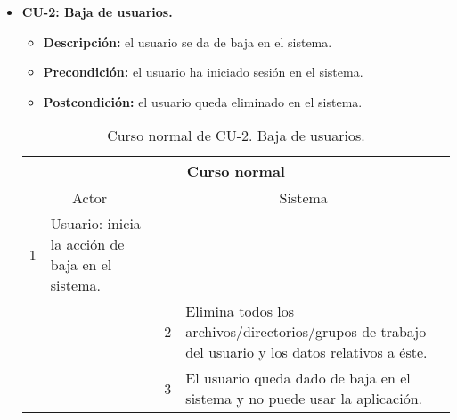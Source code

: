 \begin{itemize}
	\item \textbf{CU-2: Baja de usuarios.}
	\begin{itemize}
		\item \textbf{Descripción:} el usuario se da de baja en el sistema.
		\item \textbf{Precondición:} el usuario ha iniciado sesión en el sistema.
		\item \textbf{Postcondición:} el usuario queda eliminado en el sistema.
	\end{itemize}
	\begin{table}[H]
		\centering
		\begin{tabular}{|p{0.3cm}|p{5cm}|p{0.3cm}|p{5cm}|}
			\hline
			\multicolumn{4}{|c|}{Curso normal} \\ \hline
			\multicolumn{2}{|c|}{Actor} & \multicolumn{2}{|c|}{Sistema} \\ \hline
			1 & Usuario: inicia la acción de baja en el sistema. &  &  \\ \hline
			&  & 2 & Elimina todos los archivos/directorios/grupos de trabajo del usuario y los datos relativos a éste. \\ \hline
			&  & 3 & El usuario queda dado de baja en el sistema y no puede usar la aplicación. \\ \hline
		\end{tabular}
		\caption{Curso normal de CU-2. Baja de usuarios.}
		\label{tabla:cu2-normal}
	\end{table}
\end{itemize}

